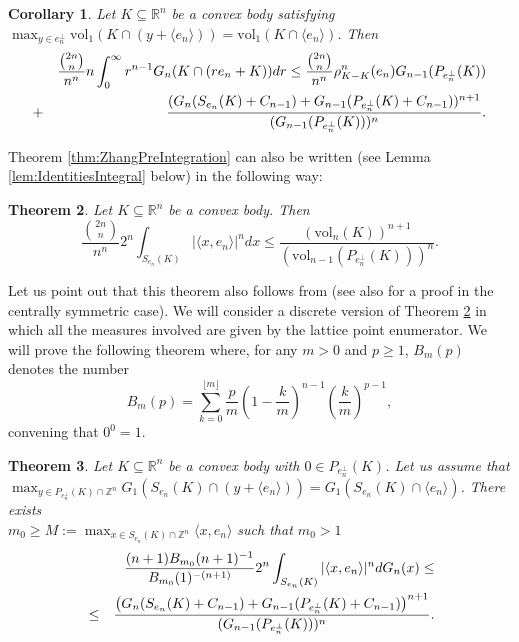 \documentclass[10pt]{amsart}
\newtheorem{thm}{Theorem}[section]
\newtheorem{cor}[thm]{Corollary}
\def\R{\mathbb{R}}
\def\Z{\mathbb{Z}}
\def\vol{\mathrm{vol}}
\numberwithin{equation}{section}
\begin{document}
\begin{cor}\label{cor:ZhangPreIntegrationLatticePoint}
Let $K\subseteq\R^n$ be a convex body satisfying $\displaystyle{\max_{y\in e_n^\perp}\vol_1(K\cap(y+\langle e_n\rangle))}=\vol_1(K\cap\langle e_n\rangle)$. Then
\begin{eqnarray*}
&&\frac{{{2n}\choose{n}}}{n^n}n\int_0^\infty r^{n-1}G_n(K\cap(re_n+K))dr\leq\frac{{{2n}\choose{n}}}{n^n}\rho_{K-K}^n(e_n)G_{n-1}(P_{e_n^\perp}(K))\cr
&+&\frac{(G_n(S_{e_n}(K)+C_{n-1})+G_{n-1}(P_{e_n^\perp}(K)+C_{n-1}))^{n+1}}{(G_{n-1}(P_{e_n^\perp}(K)))^n}.
\end{eqnarray*}
\end{cor}

Theorem \ref{thm:ZhangPreIntegration} can also be written (see Lemma \ref{lem:IdentitiesIntegral} below) in the following way:
\begin{thm}\label{thm:ZhangPreIntegration2}
Let $K\subseteq\R^n$ be a convex body. Then
$$
\frac{{{2n}\choose{n}}}{n^n}2^n\int_{S_{e_n}(K)}|\langle x,e_n\rangle|^ndx\leq\frac{(\vol_n(K))^{n+1}}{(\vol_{n-1}(P_{e_n^\perp}(K)))^n}.
$$
\end{thm}
Let us point out that this theorem also follows from \cite[Theorem 3]{Fra} (see also \cite[Corollary 2.7]{MP} for a proof in the centrally symmetric case). We will consider a discrete version of Theorem \ref{thm:ZhangPreIntegration2} in which all the measures involved are given by the lattice point enumerator. We will prove the following theorem where, for any $m>0$ and $p\geq 1$, $B_{m}(p)$ denotes the number
\begin{equation}\label{eq:DefinitionBm(p)}
B_{m}(p)=\sum_{k=0}^{\lfloor m\rfloor}\frac{p}{m}\left(1-\frac{k}{m}\right)^{n-1}\left(\frac{k}{m}\right)^{p-1},
\end{equation}
convening that $0^0=1$.

\begin{thm}\label{thm:PurelyDiscreteZhang}
Let $K\subseteq\R^n$ be a convex body with $0\in P_{e_n^\perp}(K)$. Let us assume that \\$\displaystyle{\max_{y\in P_{e_n^\perp}(K)\cap\Z^n}G_1(S_{e_n}(K)\cap(y+\langle e_n\rangle))=G_1(S_{e_n}(K)\cap\langle e_n\rangle)}$. There exists \\$\displaystyle{m_0\geq M:=\max_{x\in S_{e_n}(K)\cap\Z^n}\langle x,e_n\rangle}$ such that $m_0>1$
\begin{eqnarray*}
&&\frac{(n+1)B_{m_0}(n+1)^{-1}}{B_{m_0}(1)^{-(n+1)}}2^n\int_{S_{e_n}(K)}|\langle x,e_n\rangle|^ndG_n(x)\leq\cr
&\leq&\frac{\left(G_n(S_{e_n}(K)+C_{n-1})+G_{n-1}(P_{e_n^\perp}(K)+C_{n-1})\right)^{n+1}}{(G_{n-1}(P_{e_n^\perp}(K)))^n}.
\end{eqnarray*}
\end{thm}
\end{document}
